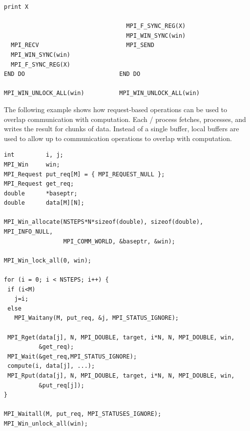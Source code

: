 \begin{example}
\begin{Verbatim}[commandchars=\\\{\}]
                                   print X

                                   MPI_F_SYNC_REG(X)
                                   MPI_WIN_SYNC(win)
  MPI_RECV                         MPI_SEND
  MPI_WIN_SYNC(win)
  MPI_F_SYNC_REG(X)
END DO                           END DO

MPI_WIN_UNLOCK_ALL(win)          MPI_WIN_UNLOCK_ALL(win)
\end{Verbatim}
\lstset{fancyvrb=false}
\end{example}

\begin{example}
%
The following example shows how request-based operations can be used
to overlap communication with computation.  Each \mpi/ process fetches,
processes, and writes the result for  chunks of data.  Instead
of a single buffer,  local buffers are used to allow up to 
communication operations to overlap with computation. 

\begin{lstlisting}[language={[MPI]C}]
int         i, j;
MPI_Win     win;
MPI_Request put_req[M] = { MPI_REQUEST_NULL };
MPI_Request get_req;
double      *baseptr;
double      data[M][N];

MPI_Win_allocate(NSTEPS*N*sizeof(double), sizeof(double), MPI_INFO_NULL,
                 MPI_COMM_WORLD, &baseptr, &win);

MPI_Win_lock_all(0, win);

for (i = 0; i < NSTEPS; i++) {
 if (i<M)
   j=i;
 else
   MPI_Waitany(M, put_req, &j, MPI_STATUS_IGNORE);

 MPI_Rget(data[j], N, MPI_DOUBLE, target, i*N, N, MPI_DOUBLE, win,
          &get_req);
 MPI_Wait(&get_req,MPI_STATUS_IGNORE);
 compute(i, data[j], ...);
 MPI_Rput(data[j], N, MPI_DOUBLE, target, i*N, N, MPI_DOUBLE, win,
          &put_req[j]);
}

MPI_Waitall(M, put_req, MPI_STATUSES_IGNORE);
MPI_Win_unlock_all(win);
\end{lstlisting}
\end{example}

